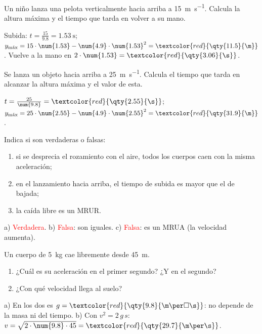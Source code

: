 \begin{exercise}
    Un niño lanza una pelota verticalmente hacia arriba a \qty{15}{\m\per\s}. Calcula la altura máxima y el tiempo que tarda en volver a su mano.
    \begin{solu}
        Subida: \(t = \frac{15}{\num{9.8}} = \qty{1.53}{\s}\); \(y_\text{máx} = 15 \cdot \num{1.53} - \num{4.9} \cdot \num{1.53}^2 = \textcolor{red}{\qty{11.5}{\m}}\). Vuelve a la mano en \(2 \cdot \num{1.53} = \textcolor{red}{\qty{3.06}{\s}}\).
    \end{solu}
\end{exercise}

\begin{exercise}
    Se lanza un objeto hacia arriba a \qty{25}{\m\per\s}. Calcula el tiempo que tarda en alcanzar la altura máxima y el valor de esta.
    \begin{solu}
        \(t = \frac{25}{\num{9.8}} = \textcolor{red}{\qty{2.55}{\s}}\); \(y_\text{máx} = 25 \cdot \num{2.55} - \num{4.9} \cdot \num{2.55}^2 = \textcolor{red}{\qty{31.9}{\m}}\).
    \end{solu}
\end{exercise}

\begin{exercise}
    Indica si son verdaderas o falsas:
    \begin{enumerate}[label=\alph*)]
        \item si se desprecia el rozamiento con el aire, todos los cuerpos caen con la misma aceleración;
        \item en el lanzamiento hacia arriba, el tiempo de subida es mayor que el de bajada;
        \item la caída libre es un MRUR.
    \end{enumerate}
    \begin{solu}
        a) \textcolor{red}{Verdadera}. b) \textcolor{red}{Falsa}: son iguales. c) \textcolor{red}{Falsa}: es un MRUA (la velocidad aumenta).
    \end{solu}
\end{exercise}

\begin{exercise}
    Un cuerpo de \qty{5}{\kg} cae libremente desde \qty{45}{\m}.
    \begin{enumerate}[label=\alph*)]
        \item ¿Cuál es su aceleración en el primer segundo? ¿Y en el segundo?
        \item ¿Con qué velocidad llega al suelo?
    \end{enumerate}
    \begin{solu}
        a) En los dos es \(g = \textcolor{red}{\qty{9.8}{\m\per\square\s}}\): no depende de la masa ni del tiempo. b) Con \(v^2 = 2\,g\,s\): \(v = \sqrt{2 \cdot \num{9.8} \cdot 45} = \textcolor{red}{\qty{29.7}{\m\per\s}}\).
    \end{solu}
\end{exercise}

